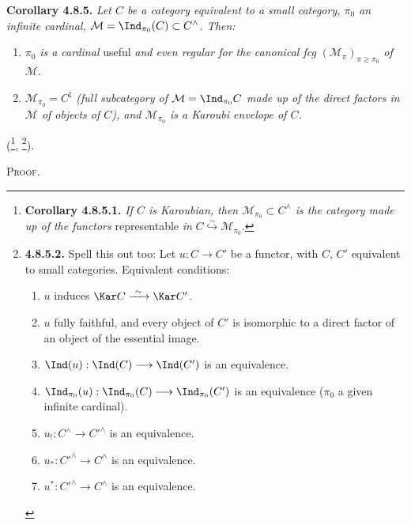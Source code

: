 \textbf{Corollary 4.8.5.} \textit{Let $C$ be a category equivalent to a small category, $\pi_0$ an infinite cardinal, $\mathcal{M}=\Ind_{\pi_0}(C)\subset C^\wedge$. Then:}
\begin{enumerate}
\item[\textit{1$^\circ$)}] $\pi_0$ \textit{is a cardinal} useful \textit{and even regular for the canonical fcg} $(\mathcal{M}_\pi)_{\pi\geqslant\pi_0}$ \textit{of} $\mathcal{M}$.
\item[\textit{2$^\circ$)}] $\mathcal{M}_{\pi_0}=C^\natural$ \textit{(full subcategory of $\mathcal{M}=\Ind_{\pi_0}C$ made up of the direct factors in $\mathcal{M}$ of objects of $C$), and $\mathcal{M}_{\pi_0}$ is a Karoubi envelope of $C$.}
\end{enumerate}
(\footnote{\textbf{Corollary 4.8.5.1.} \textit{If $C$ is Karoubian, then $\mathcal{M}_{\pi_0}\subset C^\wedge$ is the category made up of the functors} representable \textit{in} $C\overset{\sim}{\hookrightarrow}\mathcal{M}_{\pi_0}$.}, \footnote{\textbf{4.8.5.2.} Spell this out too: Let $u : C\longrightarrow C'$ be a functor, with $C$, $C'$ equivalent to small categories. Equivalent conditions:
\begin{enumerate}
\item[a)] $u$ induces $\Kar C\xrightarrow{\ \sim\ }\Kar C'$.
\item[a$'$)] $u$ fully faithful, and every object of $C'$ is isomorphic to a direct factor of an object of the essential image.
\item[b)] $\Ind(u) : \Ind(C)\longrightarrow\Ind(C')$ is an equivalence.
\item[c)] $\Ind_{\pi_0}(u) : \Ind_{\pi_0}(C)\longrightarrow\Ind_{\pi_0}(C')$ is an equivalence ($\pi_0$ a given infinite cardinal).
\item[d)] $u_! : C^\wedge\longrightarrow C'^\wedge$ is an equivalence.
\item[d$'$)] $u_* : C'^\wedge\longrightarrow C^\wedge$ is an equivalence.
\item[d$''$)] $u^* : C'^\wedge\longrightarrow C^\wedge$ is an equivalence.
\end{enumerate}}).


\textsc{Proof.}

